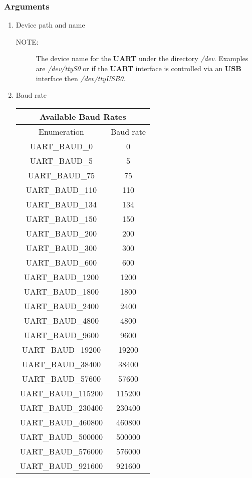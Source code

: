 \documentclass{report}
\begin{document}
\subsubsection*{Arguments}
\begin{enumerate}
\item Device path and name
\begin{description}
\item[NOTE:] The device name for the \textbf{UART} under the directory
\textit{/dev}. Examples are \textit{/dev/ttyS0} or if the \textbf{UART}
interface is controlled via an \textbf{USB} interface then \textit{/dev/ttyUSB0}.
\end{description}
\item Baud rate
\newline
\newline
\begin{tabular}{| c | c |}
\hline
\multicolumn{2}{|c|}{Available Baud Rates} \\
\hline
Enumeration & Baud rate \\
\hline
UART\_BAUD\_0 & 0 \\
UART\_BAUD\_5 & 5 \\
UART\_BAUD\_75 & 75 \\
UART\_BAUD\_110 & 110 \\
UART\_BAUD\_134 & 134 \\
UART\_BAUD\_150 & 150 \\
UART\_BAUD\_200 & 200 \\
UART\_BAUD\_300 & 300 \\
UART\_BAUD\_600 & 600 \\
UART\_BAUD\_1200 & 1200 \\
UART\_BAUD\_1800 & 1800 \\
UART\_BAUD\_2400 & 2400 \\
UART\_BAUD\_4800 & 4800 \\
UART\_BAUD\_9600 & 9600 \\
UART\_BAUD\_19200 & 19200 \\
UART\_BAUD\_38400 & 38400 \\
UART\_BAUD\_57600 & 57600 \\
UART\_BAUD\_115200 & 115200 \\
UART\_BAUD\_230400 & 230400 \\
UART\_BAUD\_460800 & 460800 \\
UART\_BAUD\_500000 & 500000 \\
UART\_BAUD\_576000 & 576000 \\
UART\_BAUD\_921600 & 921600 \\

\end{tabular}
\end{enumerate}
\end{document}
